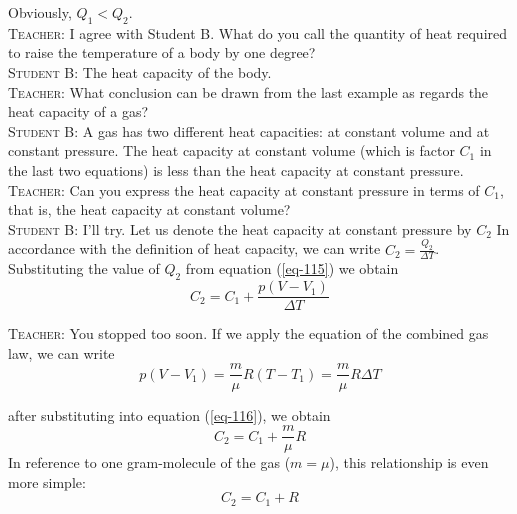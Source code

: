 \documentclass[a4paper,sfsidenotes]{tufte-book}
\begin{document}
Obviously, $Q_{1} < Q_{2}$.
\\
\textsc{Teacher:} I agree with Student B. What do you call the quantity of heat required to raise the temperature of a body by one degree?
\\
\textsc{Student B:} The heat capacity of the body.
\\
\textsc{Teacher:} What conclusion can be drawn from the last example as regards the heat capacity of a gas?
\\
\textsc{Student B:} A gas has two different heat capacities: at constant volume and at constant pressure. The heat capacity at constant volume (which is factor $C_{1}$ in the last two equations) is less than the heat capacity at constant pressure.
\\
\textsc{Teacher:} Can you express the heat capacity at constant pressure in terms of $C_{1}$, that is, the heat capacity at constant volume?
\\
\textsc{Student B:} I'll try. Let us denote the heat capacity at constant pressure by $C_{2}$ In accordance with the definition of heat capacity, we can write $C_{2}=\frac{Q_{2}}{ \Delta T}$. Substituting the value of $Q_{2}$ from equation (\ref{eq-115}) we obtain
\begin{equation}%
C_{2} = C_{1} + \frac{p(V-V_{1})}{\Delta T} 
\label{eq-116}
\end{equation}

\textsc{Teacher:} You stopped too soon. If we apply the equation of the combined gas law, we can write
\begin{equation*}%
p(V-V_{1}) = \frac{m}{\mu} R (T - T_{1}) =  \frac{m}{\mu} R \Delta T
\end{equation*}

after substituting into equation (\ref{eq-116}), we obtain
\begin{equation}%
C_{2} = C_{1} + \frac{m}{\mu} R
\label{eq-117}
\end{equation}
In reference to one gram-molecule of the gas ($m=\mu$), this relationship is even more simple:
\begin{equation}%
C_{2} = C_{1} + R
\label{eq-118}
\end{equation}
\end{document}
